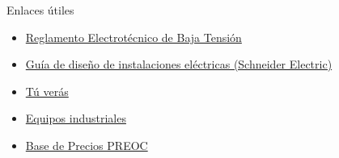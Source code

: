 \documentclass[xcolor={usenames,svgnames,dvipsnames}]{beamer}
\begin{document}
\begin{frame}[label={sec:org970c617}]{Enlaces útiles}
\begin{itemize}
\item \href{http://www.f2i2.net/legislacionseguridadindustrial/Si\_ambito.aspx?id\_am=76}{Reglamento Electrotécnico de Baja Tensión}

\item \href{http://www.schneiderelectric.es/sites/spain/es/productos-servicios/distribucion-electrica/descarga/pdf-guia-diseno-instalaciones-electricas.page}{Guía de diseño de instalaciones eléctricas (Schneider Electric)}

\item \href{http://tuveras.com/index.html}{Tú verás}

\item \href{http://www.directindustry.com/}{Equipos industriales}

\item \href{http://www.preoc.es/}{Base de Precios PREOC}
\end{itemize}
\end{frame}
\end{document}

